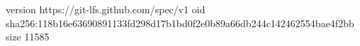 version https://git-lfs.github.com/spec/v1
oid sha256:118b16e63690891133fd298d17b1bd0f2e0b89a66db244c142462554bae4f2bb
size 11585
